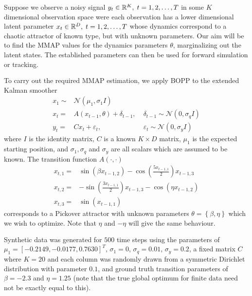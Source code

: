 Suppose we observe a noisy signal $y_t \in \mathbb{R}^{K}, \; t = 1,2,\dots,T$ in some $K$ dimensional observation space were each observation has a lower dimensional latent parameter $x_t \in \mathbb{R}^{D},  \; t = 1,2,\dots,T$ whose dynamics correspond to a chaotic attractor of known type, but with unknown parameters.  Our aim will be to find the MMAP values for the dynamics parameters $\theta$, marginalizing out the latent states.  The established parameters can then be used for forward simulation or tracking.  

To carry out the required MMAP estimation, we apply BOPP to the extended Kalman smoother
\begin{align}
\label{eq:Kalman}
x_1 \sim & \mathcal{N} \left(\mu_1, \sigma_1 I\right) \\
x_t = & A \left(x_{t-1}, \theta\right)+\delta_{t-1}, \; & \delta_{t-1} \sim \mathcal{N} \left(0, \sigma_q I\right) \\
y_t = & C x_{t}+\varepsilon_{t}, \; & \varepsilon_{t} \sim \mathcal{N} \left(0, \sigma_y I\right)
\end{align}
where $I$ is the identity matrix, $C$ is a known $K \times D$ matrix,  $\mu_1$ is the expected starting position, and $\sigma_1, \sigma_q$ and $\sigma_y$ are all scalars which are assumed to be known.  The transition function $A \left(\cdot,\cdot\right)$
\begin{subequations}
	\begin{align}
	\label{eq:pickover}
	x_{t,1} = & \sin \left(\beta x_{t-1,2}\right)-\cos\left(\frac{5x_{t-1,1}}{2}\right)x_{t-1,3}  \\
	x_{t,2} = & -\sin \left(\frac{3x_{t-1,1}}{2}\right)x_{t-1,3}-\cos\left(\eta x_{t-1,2}\right) \\
	x_{t,3} = & \sin \left(x_{t-1,1}\right)
	\end{align}
\end{subequations}
corresponds to a Pickover attractor \citep{pickover1995pattern} with unknown parameters $\theta = \left\{\beta,\eta\right\}$ which we wish to optimize.  Note that $\eta$ and $-\eta$ will give the same behaviour.

Synthetic data was generated for $500$ time steps using the parameters of  $\mu_1 = [-0.2149,-0.0177,0.7630]^T$, $\sigma_1 = 0$, $\sigma_q = 0.01$, $\sigma_y = 0.2$, a fixed matrix $C$ where $K=20$ and each column was randomly drawn from a symmetric Dirichlet distribution with parameter $0.1$, and ground truth transition parameters of $\beta = -2.3$ and $\eta = 1.25$ (note that the true global optimum for finite data need not be exactly equal to this).  

